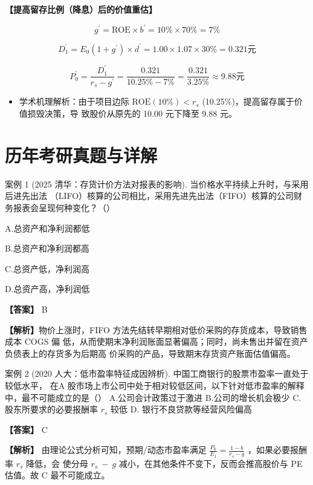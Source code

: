\documentclass[lang=cn,10pt,color=blue]{elegantbook}
\begin{document}
\textbf{\color{UnivColor} 【提高留存比例（降息）后的价值重估】} 

$$
g ^ {\prime} = \mathrm{ROE} \times b ^ {\prime} = 10 \% \times 70 \% = 7 \%
$$

$$
D _ {1} ^ {\prime} = E _ {0} \left(1 + g ^ {\prime}\right) \times d ^ {\prime} = 1. 0 0 \times 1. 0 7 \times 30 \% = 0. 3 2 1 \text {元}
$$

$$
P _ {0} ^ {\prime} = \frac {D _ {1} ^ {\prime}}{r _ {s} - g ^ {\prime}} = \frac {0.321}{10.25\% - 7\%} = \frac {0.321}{3.25\%} \approx 9.88 \text{元}
$$

\begin{itemize}
  \item 学术机理解析：由于项目边际 $\mathrm { R O E } ( 1 0 \% ) < r _ { s }$ (10.25\%)，提高留存属于价值损毁决策，导 致股价从原先的 10.00 元下降至 9.88 元。
\end{itemize}

\section{历年考研真题与详解}

案例 1 (2025 清华：存货计价方法对报表的影响). 当价格水平持续上升时，与采用后进先出法 （LIFO）核算的公司相比，采用先进先出法（FIFO）核算的公司财务报表会呈现何种变化？（） 

A.总资产和净利润都低 

B.总资产和净利润都高 

C.总资产低，净利润高 

D.总资产高，净利润低

\textbf{\color{UnivColor} 【答案】} B

\textbf{\color{UnivColor} 【解析】}物价上涨时，FIFO 方法先结转早期相对低价采购的存货成本，导致销售成本 COGS 偏 低，从而使期末净利润账面显著偏高；同时，尚未售出并留在资产负债表上的存货多为后期高 价采购的产品，导致期末存货资产账面估值偏高。 

案例 2 (2020 人大：低市盈率特征成因辨析). 中国工商银行的股票市盈率一直处于较低水平， 在A 股市场上市公司中处于相对较低区间，以下针对低市盈率的解释中，最不可能成立的是（） A.公司会计政策过于激进 B.公司的增长机会极少 C.股东所要求的必要报酬率 $r _ { s }$ 较低 D. 银行不良贷款等经营风险偏高 

\textbf{\color{UnivColor} 【答案】} C 

\textbf{\color{UnivColor} 【解析】} 由理论公式分析可知，预期/动态市盈率满足 $\displaystyle \frac { P _ { 0 } } { E _ { 1 } } = \frac { 1 - b } { r _ { s } - g }$ ，如果必要报酬率 $r _ { s }$ 降低，会 使分母 $r _ { s } \mathrm { ~ - ~ } g$ 减小，在其他条件不变下，反而会推高股价与 PE 估值。故 C 最不可能成立。 
\end{document}
